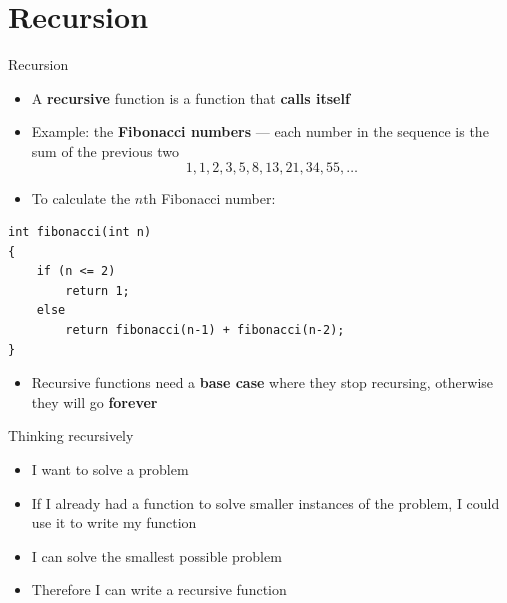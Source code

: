 \part{Recursion}
\frame{\partpage}

\begin{frame}[fragile]{Recursion}
    \begin{itemize}
        \pause\item A \textbf{recursive} function is a function that \textbf{calls itself}
        \pause\item Example: the \textbf{Fibonacci numbers} --- each number in the sequence is the sum of the previous two
    $$ 1, 1, 2, 3, 5, 8, 13, 21, 34, 55, \dots $$
        \pause\item To calculate the $n$th Fibonacci number:
    \end{itemize}
    \begin{lstlisting}
int fibonacci(int n)
{
    if (n <= 2)
        return 1;
    else
        return fibonacci(n-1) + fibonacci(n-2);
}
    \end{lstlisting}
    \begin{itemize}
        \pause\item Recursive functions need a \textbf{base case} where they stop recursing,
			otherwise they will go \textbf{forever}
    \end{itemize}
\end{frame}

\begin{frame}{Thinking recursively}
	\begin{itemize}
		\pause\item I want to solve a problem
		\pause\item If I already had a function to solve smaller instances of the problem, I could use it
			to write my function
		\pause\item I can solve the smallest possible problem
		\pause\item Therefore I can write a recursive function
	\end{itemize}
\end{frame}

